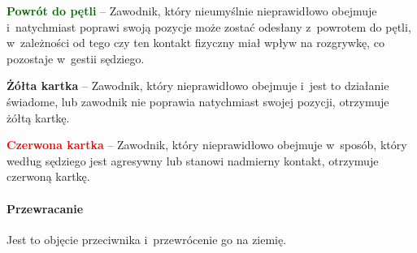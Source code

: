 \documentclass[12pt]{article}
\newcommand\redcard[1]{\bgroup\textcolor{red}{\textbf{#1}}}
\newcommand\yellowcard[1]{\bgroup\textcolor{darkyellow}{\textbf{#1}}}
\newcommand\other[1]{\bgroup\textcolor{darkgreen}{\textbf{#1}}}
\begin{document}
\other{Powrót do pętli} -- Zawodnik, który nieumyślnie nieprawidłowo
obejmuje i~natychmiast poprawi swoją pozycje może zostać odesłany z~powrotem do pętli, w~zależności od tego czy ten kontakt fizyczny miał
wpływ na rozgrywkę, co pozostaje w~gestii sędziego.

\yellowcard{Żółta kartka} -- Zawodnik, który nieprawidłowo obejmuje i~jest to
działanie świadome, lub zawodnik nie poprawia natychmiast swojej
pozycji, otrzymuje żółtą kartkę.

\redcard{Czerwona kartka} -- Zawodnik, który nieprawidłowo obejmuje w~sposób, który według sędziego jest agresywny lub stanowi nadmierny
kontakt, otrzymuje czerwoną kartkę.

\paragraph{Przewracanie}
Jest to objęcie przeciwnika i~przewrócenie go na ziemię.
\end{document}
